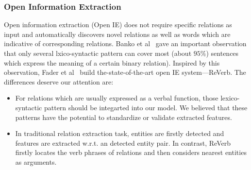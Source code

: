 \documentclass[10pt]{article} %
\theoremstyle{definition}
\theoremstyle{definition}
\begin{document}
\subsubsection{Open Information Extraction}
Open information extraction (Open IE) does not require specific relations as input and automatically discovers novel relations as well as words which are indicative of corresponding relations. 
Banko et al~\cite{openvstraditional} gave an important observation that only several lxico-syntactic pattern can cover most (about $95\%$) sentences which express the meaning of a certain binary relation). 
Inspired by this observation, Fader et al~\cite{reverb} build the-state-of-the-art open IE system---ReVerb. 
The differences deserve our attention are: 
\begin{itemize}
\item For relations which are usually expressed as a verbal function, those lexico-syntactic pattern should be integarted into our model. We believed that these patterns have the potential to standardize or validate extracted features. 
\item In traditional relation extraction task, entities are firstly detected and features are extracted w.r.t. an detected entity pair. In contrast, ReVerb firstly locates the verb phrases of relations and then considers nearest entities as arguments. 
\end{itemize}
\end{document}
